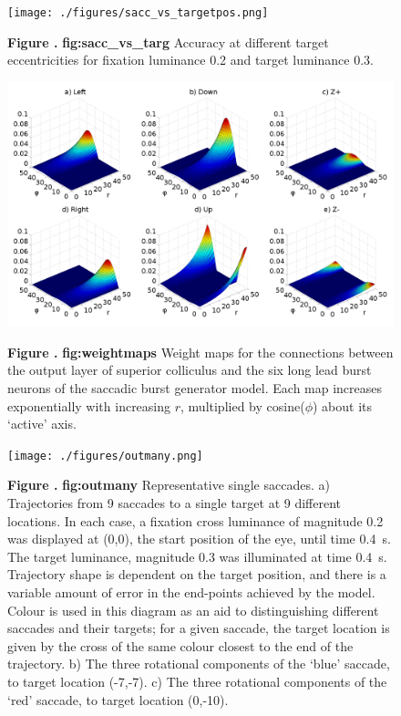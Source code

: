 \documentclass{frontiersSCNS}
\begin{document}
\begin{figure}[htb!]
\begin{center}
\texttt{[image: ./figures/sacc\_vs\_targetpos.png]}
\end{center}
\textbf{\label{fig:sacc_vs_targ} Figure .}
{ \textbf{fig:sacc\_vs\_targ} Accuracy at different target eccentricities for fixation luminance 0.2 and target luminance 0.3.}
\end{figure}

\begin{figure}[htb!]
\begin{center}
\includegraphics[width=\textwidth]{./figures/weightmaps.png}
\end{center}
\textbf{\label{fig:weightmaps} Figure .}
{ \textbf{fig:weightmaps} Weight maps for the connections between the
output layer of superior colliculus and the six long lead burst
neurons of the saccadic burst generator model. Each map increases
exponentially with increasing $r$, multiplied by cosine($\phi$) about
its `active' axis. }
\end{figure}

\begin{figure}[htb!]
\begin{center}
\texttt{[image: ./figures/outmany.png]}
\end{center}
\textbf{\label{fig:outmany} Figure .}
{ \textbf{fig:outmany} Representative single saccades. a) Trajectories
from 9 saccades to a single target at 9 different locations. In each
case, a fixation cross luminance of magnitude 0.2 was displayed at
(0,0), the start position of the eye, until time 0.4~s. The target
luminance, magnitude 0.3 was illuminated at time 0.4~s. Trajectory
shape is dependent on the target position, and there is a variable
amount of error in the end-points achieved by the model. Colour is
used in this diagram as an aid to distinguishing different saccades
and their targets; for a given saccade, the target location is given
by the cross of the same colour closest to the end of the
trajectory. b) The three rotational components of the `blue' saccade,
to target location (-7,-7). c) The three rotational components of the
`red' saccade, to target location (0,-10).}
\end{figure}
\end{document}
